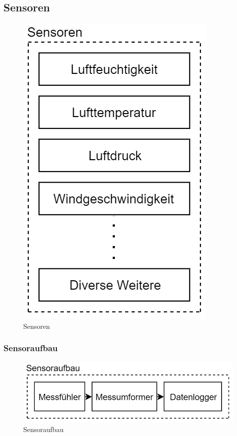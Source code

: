 \newpage
\subsection{Sensoren}
\begin{figure}[h]
\centering
\includegraphics[scale=0.8]{graphics/Sensoren.PNG}
\caption{Sensoren}
\end{figure}

\subsubsection*{Sensoraufbau}
\begin{figure}[h]
\centering
\includegraphics[scale=0.7]{graphics/Sensoraufbau.PNG}
\caption{Sensoraufbau}
\end{figure}

